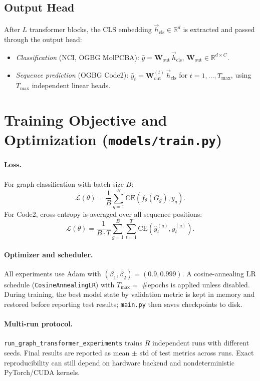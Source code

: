 \documentclass[11pt]{article}
\begin{document}
\subsection{Output Head}

After $L$ transformer blocks, the CLS embedding $\vec{h}_\text{cls} \in \mathbb{R}^d$ is extracted and passed through the output head:
\begin{itemize}
  \item \emph{Classification} (\textsf{NCI}, \textsf{OGBG MolPCBA}): $\hat{y} = \mathbf{W}_\text{out}\,\vec{h}_\text{cls}$, $\mathbf{W}_\text{out}\!\in\!\mathbb{R}^{d \times C}$.
  \item \emph{Sequence prediction} (\textsf{OGBG Code2}): $\hat{y}_t = \mathbf{W}^{(t)}_\text{out}\,\vec{h}_\text{cls}$ for $t = 1,\ldots, T_\text{max}$, using $T_\text{max}$ independent linear heads.
\end{itemize}

\section{Training Objective and Optimization (\texttt{models/train.py})}

\paragraph{Loss.}
For graph classification with batch size $B$:
\[
\mathcal{L}(\theta) = \frac{1}{B}\sum_{g=1}^{B} \mathrm{CE}(f_\theta(G_g), y_g).
\]
For Code2, cross-entropy is averaged over all sequence positions:
\[
\mathcal{L}(\theta) = \frac{1}{B\cdot T}\sum_{g=1}^{B}\sum_{t=1}^{T} \mathrm{CE}(\hat{y}^{(g)}_t, y^{(g)}_t).
\]

\paragraph{Optimizer and scheduler.}
All experiments use Adam with $(\beta_1,\beta_2) = (0.9, 0.999)$. A cosine-annealing LR schedule (\texttt{CosineAnnealingLR}) with $T_\text{max} = $ \#epochs is applied unless disabled. During training, the best model state by validation metric is kept in memory and restored before reporting test results; \texttt{main.py} then saves checkpoints to disk.

\paragraph{Multi-run protocol.}
\texttt{run\_graph\_transformer\_experiments} trains $R$ independent runs with different seeds. Final results are reported as mean $\pm$ std of test metrics across runs. Exact reproducibility can still depend on hardware backend and nondeterministic PyTorch/CUDA kernels.
\end{document}
